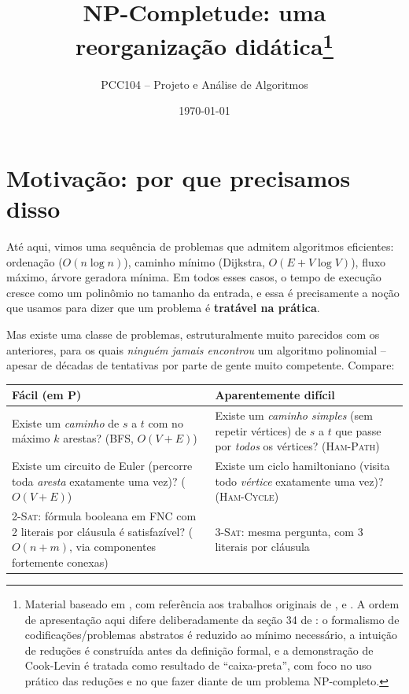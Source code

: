 \documentclass[9pt,a4paper]{extarticle}
\title{NP-Completude: uma reorganização didática\footnote{Material baseado em \citep{clrs2009}, com referência aos trabalhos originais de \citet{cook1971}, \citet{karp1972} e \citet{garey1979}. A ordem de apresentação aqui difere deliberadamente da seção 34 de \citet{clrs2009}: o formalismo de codificações/problemas abstratos é reduzido ao mínimo necessário, a intuição de reduções é construída antes da definição formal, e a demonstração de Cook-Levin é tratada como resultado de \enquote{caixa-preta}, com foco no uso prático das reduções e no que fazer diante de um problema NP-completo.}}
\author{PCC104 -- Projeto e Análise de Algoritmos}
\date{\today}
\newcommand{\impt}[1]{\textcolor{important}{\textbf{#1}}}
\theoremstyle{definition}
\begin{document}
\maketitle
\tableofcontents

\section{Motivação: por que precisamos disso}\label{sec:motivacao}

Até aqui, vimos uma sequência de problemas que admitem algoritmos eficientes: ordenação (\(O(n\log n)\)), caminho mínimo (Dijkstra, \(O(E + V\log V)\)), fluxo máximo, árvore geradora mínima. Em todos esses casos, o tempo de execução cresce como um polinômio no tamanho da entrada, e essa é precisamente a noção que usamos para dizer que um problema é \impt{tratável na prática}.

Mas existe uma classe de problemas, estruturalmente muito parecidos com os anteriores, para os quais \emph{ninguém jamais encontrou} um algoritmo polinomial -- apesar de décadas de tentativas por parte de gente muito competente. Compare:

\begin{center}
\begin{tabular}{@{}p{6.2cm}p{6.2cm}@{}}
\toprule
\textbf{Fácil (em P)} & \textbf{Aparentemente difícil} \\
\midrule
Existe um \emph{caminho} de \(s\) a \(t\) com no máximo \(k\) arestas? (BFS, \(O(V+E)\)) & Existe um \emph{caminho simples} (sem repetir vértices) de \(s\) a \(t\) que passe por \emph{todos} os vértices? (\textsc{Ham-Path}) \\[2pt]
Existe um circuito de Euler (percorre toda \emph{aresta} exatamente uma vez)? (\(O(V+E)\)) & Existe um ciclo hamiltoniano (visita todo \emph{vértice} exatamente uma vez)? (\textsc{Ham-Cycle}) \\[2pt]
\textsc{2-Sat}: fórmula booleana em FNC\footnotemark{} com 2 literais por cláusula é satisfazível? (\(O(n+m)\), via componentes fortemente conexas) & \textsc{3-Sat}: mesma pergunta, com 3 literais por cláusula \\
\bottomrule
\end{tabular}
\end{center}
\end{document}

